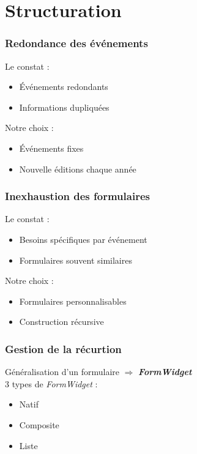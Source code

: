 \section{Structuration}

\begin{frame}
    \frametitle{Redondance des événements}
    Le constat :
    \begin{itemize}
        \item Événements redondants
        \item Informations dupliquées
    \end{itemize}
    \pause
    \vspace{2em}
    Notre choix :
    \begin{itemize}
        \item Événements fixes
        \item Nouvelle éditions chaque année
    \end{itemize}
\end{frame}

\begin{frame}
    \frametitle{Inexhaustion des formulaires}
    Le constat :
    \begin{itemize}
        \item Besoins spécifiques par événement
        \item Formulaires souvent similaires
    \end{itemize}
    \pause
    \vspace{2em}
    Notre choix :
    \begin{itemize}
        \item Formulaires personnalisables
        \item Construction récursive
    \end{itemize}
\end{frame}

\begin{frame}
    \frametitle{Gestion de la récurtion}
    Généralisation d'un formulaire $\Longrightarrow$ \textit{\textbf{FormWidget}} \\
    \pause
    \vspace{3em}
    3 types de \textit{FormWidget} :
    \begin{itemize}
        \item<3-> Natif
        \item<4-> Composite
        \item<5-> Liste
    \end{itemize}
\end{frame}

